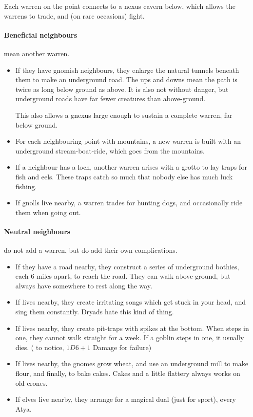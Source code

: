 \begin{multicols}{2}
Each warren on the point connects to a nexus cavern below, which allows the warrens to trade, and (on rare occasions) fight.

\paragraph{Beneficial neighbours}
mean another warren.

\begin{itemize}
  \item
  If they have gnomish neighbours, they enlarge the natural tunnels beneath them to make an underground road.
  The ups and downs mean the path is twice as long below ground as above.
  It is also not without danger, but underground roads have far fewer creatures than above-ground.

  This also allows a gnexus large enough to sustain a complete warren, far below ground.
  \item
  For each neighbouring point with mountains, a new warren is built with an underground stream-boat-ride, which goes from the mountains.
  \item
  If a neighbour has a loch, another warren arises with a grotto to lay traps for fish and eels.
  These traps catch so much that nobody else has much luck fishing.
  \item
  If gnolls live nearby, a warren trades for hunting dogs, and occasionally ride them when going out.
\end{itemize}

\paragraph{Neutral neighbours}
do not add a warren, but do add their own complications.

\begin{itemize}
  \item
  If they have a road nearby, they construct a series of underground bothies, each 6 miles apart, to reach the road.
  They can walk above ground, but always have somewhere to rest along the way.
  \item
  If  lives nearby, they create irritating songs which get stuck in your head, and sing them constantly.  Dryads hate this kind of thing.
  \item
  If  lives nearby, they create pit-traps with spikes at the bottom.
  When  steps in one, they cannot walk straight for a week.
  If a goblin steps in one, it usually dies.
  ( \tn[12] to notice, $1D6+1$ Damage for failure)
  \item
  If  lives nearby, the gnomes grow wheat, and use an underground mill to make flour, and finally, to bake cakes.  Cakes and a little flattery always works on old crones.
  \item
  If elves live nearby, they arrange for a magical dual (just for sport), every \gls{Atya}.


\end{itemize}
\end{multicols}
